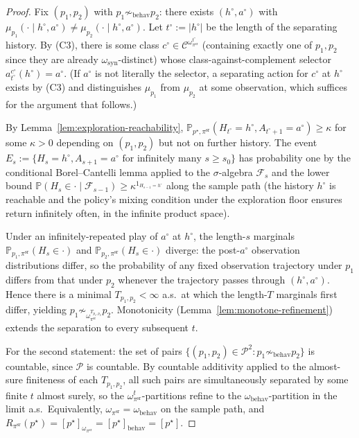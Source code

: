 \documentclass[11pt]{article}
\theoremstyle{definition}
\theoremstyle{remark}
\newcommand{\Ccal}{\mathcal{C}}
\newcommand{\Pcal}{\mathcal{P}}
\newcommand{\Prob}{\mathbb{P}}
\begin{document}
\begin{proof}
Fix $(p_1,p_2)$ with $p_1\not\sim_{\mathrm{behav}}p_2$: there exists $(h^{\circ},a^{\circ})$ with $\mu_{p_1}(\cdot\mid h^{\circ},a^{\circ})\neq\mu_{p_2}(\cdot\mid h^{\circ},a^{\circ})$. Let $t^\circ:=|h^\circ|$ be the length of the separating history. By (C3), there is some class $c^\circ\in\Ccal^{\omega_{\pi^{\mathrm{sr}}}^{t^\circ}}$ (containing exactly one of $p_1,p_2$ since they are already $\omega_{\mathrm{syn}}$-distinct) whose class-against-complement selector $a_{t^\circ}^{c^\circ}(h^\circ)=a^\circ$. (If $a^\circ$ is not literally the selector, a separating action for $c^\circ$ at $h^\circ$ exists by (C3) and distinguishes $\mu_{p_1}$ from $\mu_{p_2}$ at some observation, which suffices for the argument that follows.)

By Lemma~\ref{lem:exploration-reachability}, $\Prob_{p^\star,\pi^{\mathrm{sr}}}(H_{t^\circ}=h^\circ,A_{t^\circ+1}=a^\circ)\ge\kappa$ for some $\kappa>0$ depending on $(p_1,p_2)$ but not on further history. The event $E_s:=\{H_s=h^\circ, A_{s+1}=a^\circ\text{ for infinitely many }s\ge s_0\}$ has probability one by the conditional Borel--Cantelli lemma applied to the $\sigma$-algebra $\mathcal F_s$ and the lower bound $\Prob(H_s\in\cdot\mid\mathcal F_{s-1})\ge\kappa^{1_{H_{s-1}=h^\circ}}$ along the sample path (the history $h^\circ$ is reachable and the policy's mixing condition under the exploration floor ensures return infinitely often, in the infinite product space).

Under an infinitely-repeated play of $a^\circ$ at $h^\circ$, the length-$s$ marginals $\Prob_{p_1,\pi^{\mathrm{sr}}}(H_s\in\cdot)$ and $\Prob_{p_2,\pi^{\mathrm{sr}}}(H_s\in\cdot)$ diverge: the post-$a^\circ$ observation distributions differ, so the probability of any fixed observation trajectory under $p_1$ differs from that under $p_2$ whenever the trajectory passes through $(h^\circ,a^\circ)$. Hence there is a minimal $T_{p_1,p_2}<\infty$ a.s.\ at which the length-$T$ marginals first differ, yielding $p_1\not\sim_{\omega_{\pi^{\mathrm{sr}}}^{T_{p_1,p_2}}}p_2$. Monotonicity (Lemma~\ref{lem:monotone-refinement}) extends the separation to every subsequent $t$.

For the second statement: the set of pairs $\{(p_1,p_2)\in\Pcal^2:p_1\not\sim_{\mathrm{behav}}p_2\}$ is countable, since $\Pcal$ is countable. By countable additivity applied to the almost-sure finiteness of each $T_{p_1,p_2}$, all such pairs are simultaneously separated by some finite $t$ almost surely, so the $\omega_{\pi^{\mathrm{sr}}}^t$-partitions refine to the $\omega_{\mathrm{behav}}$-partition in the limit a.s.\ Equivalently, $\omega_{\pi^{\mathrm{sr}}}=\omega_{\mathrm{behav}}$ on the sample path, and $R_{\pi^{\mathrm{sr}}}(p^\star)=[p^\star]_{\omega_{\pi^{\mathrm{sr}}}}=[p^\star]_{\mathrm{behav}}=[p^\star]$.
\end{proof}
\end{document}
